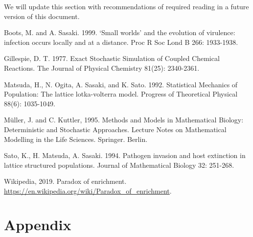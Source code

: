 \documentclass[11pt, oneside]{article}   	%
\begin{document}
We will update this section with recommendations of required reading in a future version of this document.

\makeatletter
\renewcommand\@biblabel[1]{}
\makeatother

\begin{thebibliography}{10}

 Boots, M. and A. Sasaki. 1999. `Small worlds' and the evolution of virulence: infection occurs locally and at a distance. Proc R Soc Lond B 266: 1933-1938.

 Gillespie, D. T. 1977. Exact Stochastic Simulation of Coupled Chemical Reactions. The Journal of Physical Chemistry 81(25): 2340-2361.

 Matsuda, H., N. Ogita, A. Sasaki, and K. Sato. 1992. Statistical Mechanics of Population: The lattice lotka-volterra model. Progress of Theoretical Physical 88(6):  1035-1049.

M\"uller, J. and C. Kuttler, 1995. Methods and Models in Mathematical Biology: Deterministic and Stochastic Approaches. Lecture Notes on Mathematical Modelling in the Life Sciences. Springer. Berlin.

 Sato, K.,  H. Matsuda, A. Sasaki. 1994. Pathogen invasion and host extinction in lattice structured populations. Journal of Mathematical Biology 32: 251-268.

 Wikipedia, 2019. Paradox of enrichment. \url{https://en.wikipedia.org/wiki/Paradox_of_enrichment}.

\end{thebibliography}
\newpage
\renewcommand\appendix{\clearpage\pagenumbering{arabic}\origappendix}
\renewcommand{\theequation}{A.\arabic{equation}}
\setcounter{equation}{0} 
\renewcommand{\thefigure}{A.\arabic{figure}}
\setcounter{figure}{0} 
\renewcommand{\thetable}{A.\arabic{table}}
\setcounter{table}{0} 
\setcounter{section}{0} 
\renewcommand{\thesection}{A.\arabic{section}}
\section{Appendix}\label{sec:Appendix}
\end{document}
